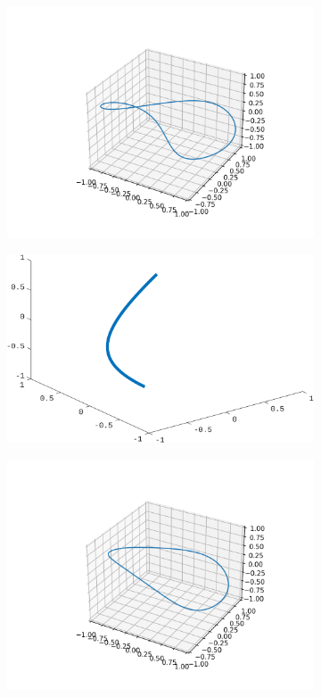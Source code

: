 \documentclass[../dissertation.tex]{subfiles}
\begin{document}
\begin{figure}[tbp]
\begin{subfigure}[b]{0.5\textwidth}
        \includegraphics[width=\textwidth]{sections/FourierSeriesImgs/Fourier1}
    \end{subfigure}
    \begin{subfigure}[b]{0.45\textwidth}
        \centering
        \includegraphics[width=\textwidth]{sections/FourierSeriesImgs/Chebyshev1}
    \end{subfigure}
    \begin{subfigure}[b]{0.5\textwidth}
        \centering
        \includegraphics[width=\textwidth]{sections/FourierSeriesImgs/Fourier2}

\end{subfigure}
\end{figure}
\end{document}
